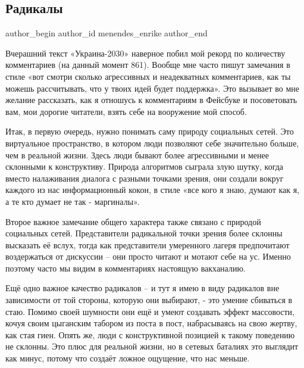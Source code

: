  
 
 
 
 
 
\subsection{Радикалы}
\label{sec:12_01_2022.fb.menendes_enrike.1.radikaly}
 
\ifcmt
 author_begin
   author_id menendes_enrike
 author_end
\fi

Вчерашний текст «Украина-2030» наверное побил мой рекорд по количеству
комментариев (на данный момент 861). Вообще мне часто пишут замечания в стиле
«вот смотри сколько агрессивных и неадекватных комментариев, как ты можешь
рассчитывать, что у твоих идей будет поддержка». Это вызывает во мне желание
рассказать, как я отношусь к комментариям в Фейсбуке и посоветовать вам, мои
дорогие читатели, взять себе на вооружение мой способ.

Итак, в первую очередь, нужно понимать саму природу социальных сетей. Это
виртуальное пространство, в котором люди позволяют себе значительно больше, чем
в реальной жизни. Здесь люди бывают более агрессивными и менее склонными к
конструктиву. Природа алгоритмов сыграла злую шутку, когда вместо налаживания
диалога с разными точками зрения, они создали вокруг каждого из нас
информационный кокон, в стиле «все кого я знаю, думают как я, а те кто думает
не так - маргиналы».

Второе важное замечание общего характера также связано с природой социальных
сетей. Представители радикальной точки зрения более склонны высказать её вслух,
тогда как представители умеренного лагеря предпочитают воздержаться от
дискуссии – они просто читают и мотают себе на ус. Именно поэтому часто мы
видим в комментариях настоящую вакханалию.

Ещё одно важное качество радикалов – и тут я имею в виду радикалов вне
зависимости от той стороны, которую они выбирают, - это умение сбиваться в
стаю. Помимо своей шумности они ещё и умеют создавать эффект массовости, кочуя
своим цыганским табором из поста в пост, набрасываясь на свою жертву, как стая
гиен. Опять же, люди с конструктивной позицией к такому поведению не склонны.
Это плюс для реальной жизни, но в сетевых баталиях это выглядит как минус,
потому что создаёт ложное ощущение, что нас меньше.

